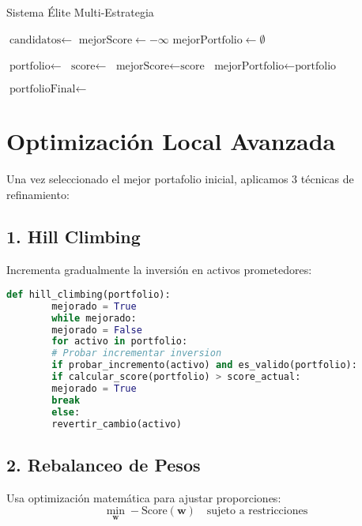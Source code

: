\documentclass[11pt,a4paper]{article}
\begin{document}
	\begin{algorithm}
		\caption{Sistema Élite Multi-Estrategia}
		\begin{algorithmic}[1]
			\State $\text{candidatos} \leftarrow$ 
			\State $\text{mejorScore} \leftarrow -\infty$
			\State $\text{mejorPortfolio} \leftarrow \emptyset$
			
			\State $\text{portfolio} \leftarrow$ 
			\State $\text{score} \leftarrow$ 
			\State $\text{mejorScore} \leftarrow \text{score}$
			\State $\text{mejorPortfolio} \leftarrow \text{portfolio}$
			\EndIf
			\EndFor
			
			\State $\text{portfolioFinal} \leftarrow$ 
			\State {}
			\EndProcedure
		\end{algorithmic}
	\end{algorithm}
	
	\section{Optimización Local Avanzada}
	
	Una vez seleccionado el mejor portafolio inicial, aplicamos 3 técnicas de refinamiento:
	
	\subsection{1. Hill Climbing}
	Incrementa gradualmente la inversión en activos prometedores:
	\begin{lstlisting}[language=Python]
		def hill_climbing(portfolio):
		mejorado = True
		while mejorado:
		mejorado = False
		for activo in portfolio:
		# Probar incrementar inversion
		if probar_incremento(activo) and es_valido(portfolio):
		if calcular_score(portfolio) > score_actual:
		mejorado = True
		break
		else:
		revertir_cambio(activo)
	\end{lstlisting}
	
	\subsection{2. Rebalanceo de Pesos}
	Usa optimización matemática para ajustar proporciones:
	\begin{equation}
		\min_{\mathbf{w}} -\text{Score}(\mathbf{w}) \quad \text{sujeto a restricciones}
	\end{equation}
	
\end{document}
